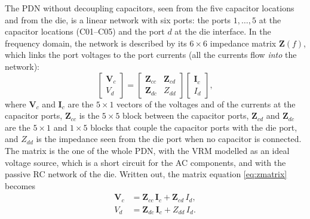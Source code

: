 The PDN without decoupling capacitors, seen from the five capacitor locations and from the die, is a linear network with six ports: the ports $1,\dots,5$ at
the capacitor locations (C01--C05) and the port $d$ at the die interface. In the frequency domain, the network is described by its $6\times 6$ impedance matrix
$\mathbf{Z}(f)$, which links the port voltages to the port currents (all the currents flow \textit{into} the network):
\begin{equation}
  \begin{bmatrix} \mathbf{V}_c \\ V_d \end{bmatrix} =
  \begin{bmatrix} \mathbf{Z}_{cc} & \mathbf{Z}_{cd} \\ \mathbf{Z}_{dc} & Z_{dd} \end{bmatrix}
  \begin{bmatrix} \mathbf{I}_c \\ I_d \end{bmatrix},
  \label{eq:zmatrix}
\end{equation}
where $\mathbf{V}_c$ and $\mathbf{I}_c$ are the $5\times 1$ vectors of the voltages and of the currents at the capacitor ports, $\mathbf{Z}_{cc}$ is the
$5\times 5$ block between the capacitor ports, $\mathbf{Z}_{cd}$ and $\mathbf{Z}_{dc}$ are the $5\times 1$ and $1\times 5$ blocks that couple the capacitor
ports with the die port, and $Z_{dd}$ is the impedance seen from the die port when no capacitor is connected. The matrix is the one of the whole PDN, with the
VRM modelled as an ideal voltage source, which is a short circuit for the AC components, and with the passive RC network of the die.
Written out, the matrix equation \eqref{eq:zmatrix} becomes
\begin{align}
  \mathbf{V}_c &= \mathbf{Z}_{cc}\,\mathbf{I}_c + \mathbf{Z}_{cd}\,I_d, \label{eq:vc}\\
  V_d &= \mathbf{Z}_{dc}\,\mathbf{I}_c + Z_{dd}\,I_d. \label{eq:vd}
\end{align}

